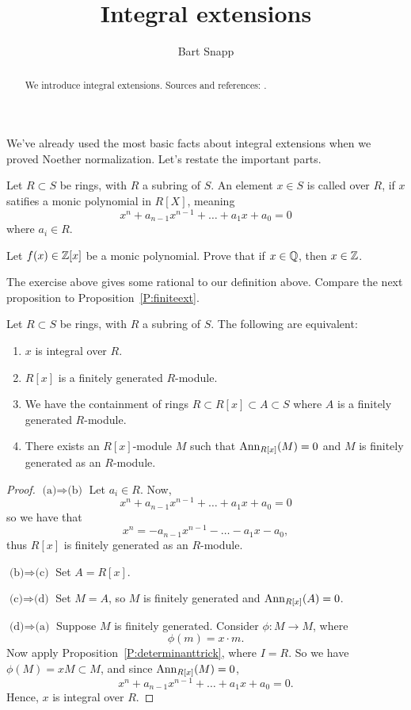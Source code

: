 \documentclass{ximera}
\author{Bart Snapp}
\title{Integral extensions}
\begin{document}
\begin{abstract}
  We introduce integral extensions. Sources and references:
  \cite{AM1969}.
\end{abstract}
\maketitle


We've already used the most basic facts about integral extensions when
we proved Noether normalization. Let's restate the important parts.
\begin{definition}
  Let $R\subset S$ be rings, with $R$ a subring of $S$. An element
  $x\in S$ is called  over $R$, if $x$ satifies a monic
  polynomial in $R[X]$, meaning
  \[
  x^n + a_{n-1} x^{n-1} + \dots + a_1 x + a_0  = 0
  \]
  where $a_i\in R$.
\end{definition}

\begin{exercise}
  Let $f(x)\in\mathbb Z[x]$ be a monic polynomial. Prove that if $x\in\mathbb Q$,
  then $x\in\mathbb Z$.
\end{exercise}

The exercise above gives some rational to our definition
above. Compare the next proposition to Proposition~\ref{P:finiteext}.

\begin{proposition}
  Let $R\subset S$ be rings, with $R$ a subring of $S$. The following are equivalent:
  \begin{enumerate}
  \item $x$ is integral over $R$.
  \item $R[x]$ is a finitely generated $R$-module.
  \item We have the containment of rings $R\subset R[x] \subset
    A\subset S$ where $A$ is a finitely generated $R$-module.
  \item There exists an $R[x]$-module $M$ such that $\operatorname{Ann}_{R[x]}(M) =
    0$ and $M$ is finitely generated as an $R$-module.
  \end{enumerate}
  \begin{proof}
    $\text{(a)}\Rightarrow \text{(b)}$ Let $a_i\in R$. Now, 
    \[
    x^n + a_{n-1} x^{n-1} + \dots + a_1 x + a_0  = 0
    \]
    so we have that
    \[
    x^n = - a_{n-1} x^{n-1} - \dots - a_1 x - a_0,
    \] 
    thus $R[x]$ is finitely generated as an $R$-module.

    
    $\text{(b)}\Rightarrow \text{(c)}$ Set $A=R[x]$.


    $\text{(c)}\Rightarrow \text{(d)}$ Set $M=A$, so $M$ is finitely
    generated and $\operatorname{Ann}_{R[x]}(A)=0$.


    $\text{(d)}\Rightarrow \text{(a)}$ Suppose $M$ is finitely
    generated. Consider $\phi:M \to M$, where
    \[
    \phi(m) = x\cdot m.
    \]
    Now apply Proposition~\ref{P:determinanttrick}, where $I= R$. So
    we have $\phi(M) = xM \subset M$, and since $\operatorname{Ann}_{R[x]}(M) = 0$,
    \[
    x^n+ a_{n-1}x^{n-1} + \dots + a_1 x  + a_0 = 0.
    \]
    Hence, $x$ is integral over $R$.
  \end{proof}
\end{proposition}
\end{document}
